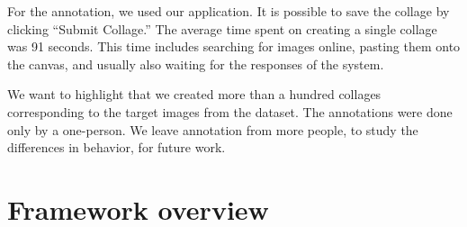 For the annotation, we used our application. It is possible to save the collage by clicking ``Submit Collage.'' The average time spent on creating a single collage was 91 seconds. This time includes searching for images online, pasting them onto the canvas, and usually also waiting for the responses of the system.

We want to highlight that we created more than a hundred collages corresponding to the target images from the dataset. The annotations were done only by a one-person. We leave annotation from more people, to study the differences in behavior, for future work. 

\section{Framework overview}

